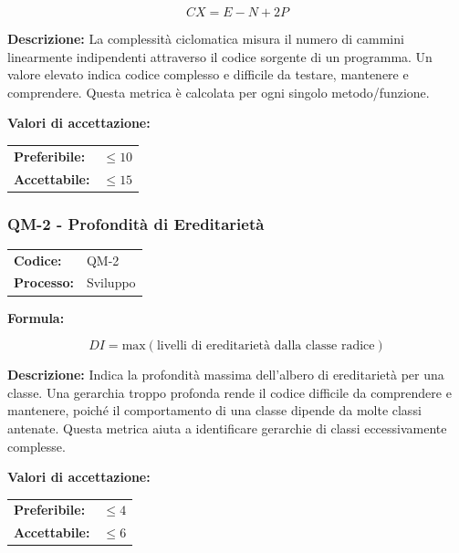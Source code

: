 \documentclass[a4paper,11pt,oneside]{scrartcl}
\begin{document}
\[
CX = E - N + 2P
\]

\noindent\textbf{Descrizione:} La complessità ciclomatica misura il numero di cammini linearmente indipendenti attraverso il codice sorgente di un programma. Un valore elevato indica codice complesso e difficile da testare, mantenere e comprendere. Questa metrica è calcolata per ogni singolo metodo/funzione.

\vspace{0.2cm}
\noindent\textbf{Valori di accettazione:}
\vspace{0.1cm}

\noindent
\begin{tabular}{@{}ll@{}}
\textbf{Preferibile:} & $\le 10$ \\
\textbf{Accettabile:} & $\le 15$ \\
\end{tabular}

\subsubsection{QM-2 - Profondità di Ereditarietà}

\noindent
\begin{tabular}{@{}p{}p{}@{}}
\textbf{Codice:} & QM-2 \\
\textbf{Processo:} & Sviluppo \\
\end{tabular}

\vspace{0.3cm}
\noindent\textbf{Formula:}

\[
DI = \text{max}(\text{livelli di ereditarietà dalla classe radice})
\]

\noindent\textbf{Descrizione:} Indica la profondità massima dell'albero di ereditarietà per una classe. Una gerarchia troppo profonda rende il codice difficile da comprendere e mantenere, poiché il comportamento di una classe dipende da molte classi antenate. Questa metrica aiuta a identificare gerarchie di classi eccessivamente complesse.

\vspace{0.2cm}
\noindent\textbf{Valori di accettazione:}
\vspace{0.1cm}

\noindent
\begin{tabular}{@{}ll@{}}
\textbf{Preferibile:} & $\le 4$ \\
\textbf{Accettabile:} & $\le 6$ \\
\end{tabular}
\end{document}
